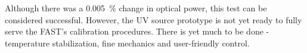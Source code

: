 \par 
 
Although there was a 0.005~$\%$ change in optical power, this test can be considered successful. However, the UV source prototype is not yet ready to fully serve the FAST's calibration procedures. There is yet much to be done - temperature stabilization, fine mechanics and user-friendly control.





